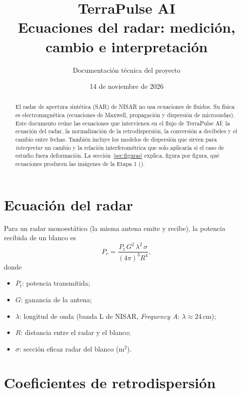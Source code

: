 \documentclass[11pt,a4paper]{article}
\title{TerraPulse AI\\[2pt]\large Ecuaciones del radar: medición, cambio e interpretación}
\author{Documentación técnica del proyecto}
\date{14 de noviembre de 2026}
\begin{document}
\maketitle

\begin{abstract}
El radar de apertura sintética (SAR) de NISAR no usa ecuaciones de fluidos. Su física es
electromagnética (ecuaciones de Maxwell, propagación y dispersión de microondas). Este documento
reúne las ecuaciones que intervienen en el flujo de TerraPulse AI: la ecuación del radar, la
normalización de la retrodispersión, la conversión a decibeles y el cambio entre fechas. También
incluye los modelos de dispersión que sirven para \emph{interpretar} un cambio y la relación
interferométrica que solo aplicaría si el caso de estudio fuera deformación. La sección~\ref{sec:figuras} explica, figura por
figura, qué ecuaciones producen las imágenes de la Etapa 1 ().
\end{abstract}

\section{Ecuación del radar}

Para un radar monoestático (la misma antena emite y recibe), la potencia recibida de un blanco es
\begin{equation}
  P_r = \frac{P_t\, G^2\, \lambda^2\, \sigma}{(4\pi)^3 R^4},
  \label{eq:radar}
\end{equation}
donde
\begin{itemize}
  \item $P_t$: potencia transmitida;
  \item $G$: ganancia de la antena;
  \item $\lambda$: longitud de onda (banda L de NISAR, \emph{Frequency A}: $\lambda \approx 24$\,cm);
  \item $R$: distancia entre el radar y el blanco;
  \item $\sigma$: sección eficaz radar del blanco (m$^2$).
\end{itemize}

\section{Coeficientes de retrodispersión}
\end{document}
